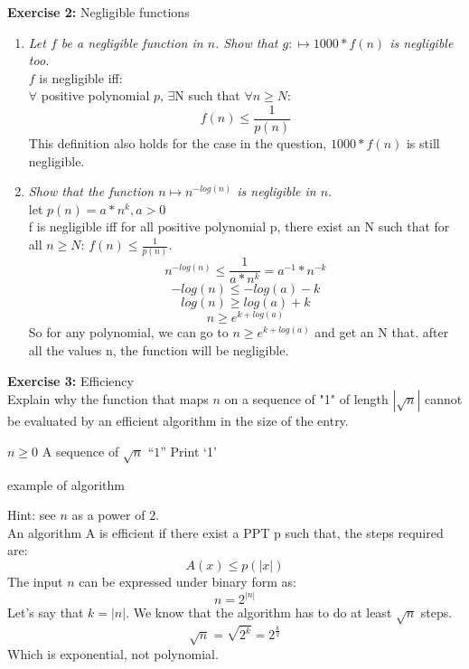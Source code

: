 \documentclass[12pt]{article}
\begin{document}
\textbf{Exercise 2:} Negligible functions\\
\begin{enumerate}
\item \emph{Let $f$ be a negligible function in $n$. Show that $g:\mapsto 1000*f(n)$ is negligible too.}\\
$f$ is negligible iff:\\
$\forall$ positive polynomial $p$, $\exists$N such that $\forall n\ge N$:\\
\begin{equation}
f(n) \le \frac{1}{p(n)}
\end{equation}
This definition also holds for the case in the question, $1000*f(n)$ is still negligible.
\item \emph{Show that the function $n\mapsto n^{-log(n)}$ is negligible in $n$}.\\
let $p(n)=a*n^k, a > 0$\\
f is negligible iff for all positive polynomial p, there exist an N such that for all $n\geq N$: $ f(n) \leq \frac{1}{p(n)}$.
\begin{equation*}
n^{-log(n)} \le \frac{1}{a*n^k} = a^{-1}* n^{-k}
\end{equation*}
\begin{equation*}
-log(n) \le -log(a) - k
\end{equation*}
\begin{equation*}
log(n) \ge log(a) + k
\end{equation*}
\begin{equation*}
n \ge e^{k+log(a)}
\end{equation*}
So for any polynomial, we can go to $n \ge e^{k+log(a)}$ and get an N that. after all the values n, the function will be negligible.\\
\end{enumerate}
\newpage



\textbf{Exercise 3:} Efficiency\\
Explain why the function that maps $n$ on a sequence of "1" of length $|\sqrt{n}|$ cannot be evaluated by an efficient algorithm in the size of the entry.
\begin{algorithm}
\begin{algorithmic}
    \REQUIRE $n \geq 0$
    \ENSURE A sequence of $\sqrt{n}$ ``$1$''
        \STATE Print `1'
    \ENDFOR
\end{algorithmic}
\caption{example of algorithm}
\label{alg1}      
\end{algorithm}
Hint: see $n$ as a power of $2$.\\
An algorithm A is efficient if there exist a PPT p such that, the steps required are:
  \[ A(x) \leq p(|x|) \]
The input $n$ can be expressed under binary form as: \[n = 2^{|n|}\]
  Let's say that $k = |n|$. We know that the algorithm has to do at least $\sqrt{n}$ steps.
 \[\sqrt{n} = \sqrt{2^k} = 2^{\frac{k}{2}}\]
  Which is exponential, not polynomial.
\newpage
\end{document}
